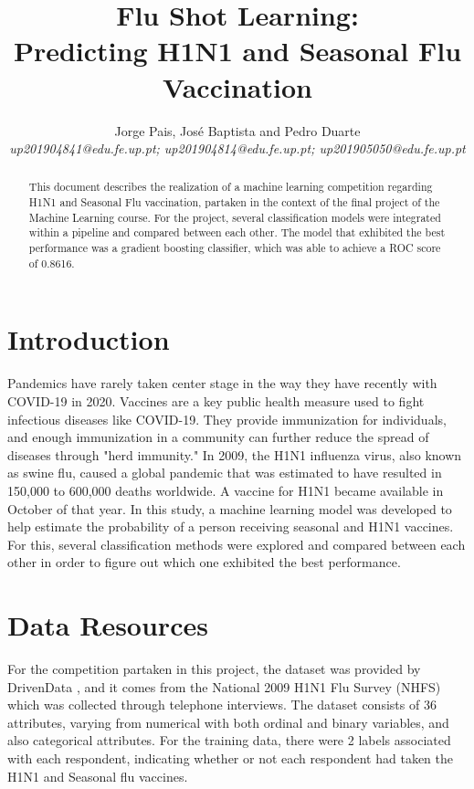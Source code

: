 \documentclass{IEEEtran}
\begin{document}
\title{Flu Shot Learning: \\Predicting H1N1 and Seasonal Flu Vaccination}
\author{Jorge Pais, José Baptista and Pedro Duarte\\ 
    \textit{up201904841@edu.fe.up.pt; up201904814@edu.fe.up.pt; up201905050@edu.fe.up.pt}}

\maketitle

\begin{abstract}
    This document describes the realization of a machine learning competition regarding H1N1 and Seasonal Flu vaccination, partaken in the context of the final project of the Machine Learning course. For the project, several classification models were integrated within a pipeline and compared between each other. The model that exhibited the best performance was a gradient boosting classifier, which was able to achieve a ROC score of 0.8616.
\end{abstract}

\section{Introduction}
Pandemics have rarely taken center stage in the way they have recently with COVID-19 in 2020.  Vaccines are a key public health measure used to fight infectious diseases like COVID-19. They provide immunization for individuals, and enough immunization in a community can further reduce the spread of diseases through "herd immunity." 
In 2009, the H1N1 influenza virus, also known as swine flu, caused a global pandemic that was estimated to have resulted in 150,000 to 600,000 deaths worldwide. A vaccine for H1N1 became available in October of that year. In this study, a machine learning model was developed to help estimate the probability of a person receiving seasonal and H1N1 vaccines. For this, several classification methods were explored and compared between each other in order to figure out which one exhibited the best performance.

\section{Data Resources}

For the competition partaken in this project, the dataset was provided by DrivenData \cite{b1}, and it comes from the National 2009 H1N1 Flu Survey (NHFS) which was collected through telephone interviews. The dataset consists of 36 attributes, varying from numerical with both ordinal and binary variables, and also categorical attributes. For the training data, there were 2 labels associated with each respondent, indicating whether or not each respondent had taken the H1N1 and Seasonal flu vaccines.
\end{document}
